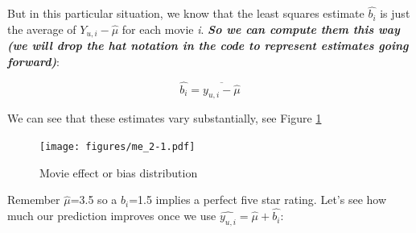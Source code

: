 \documentclass[
]{article}
\newenvironment{Shaded}{}{}
\newcommand{\AttributeTok}[1]{\textcolor[rgb]{0.49,0.56,0.16}{#1}}
\newcommand{\DecValTok}[1]{\textcolor[rgb]{0.25,0.63,0.44}{#1}}
\newcommand{\FloatTok}[1]{\textcolor[rgb]{0.25,0.63,0.44}{#1}}
\newcommand{\FunctionTok}[1]{\textcolor[rgb]{0.02,0.16,0.49}{#1}}
\newcommand{\NormalTok}[1]{#1}
\newcommand{\OtherTok}[1]{\textcolor[rgb]{0.00,0.44,0.13}{#1}}
\newcommand{\SpecialCharTok}[1]{\textcolor[rgb]{0.25,0.44,0.63}{#1}}
\newcommand{\StringTok}[1]{\textcolor[rgb]{0.25,0.44,0.63}{#1}}
\begin{document}
But in this particular situation, we know that the least squares
estimate \(\hat{b_{i}}\) is just the average of \(Y_{u,i}-\hat{\mu}\)
for each movie \emph{i}. \textbf{\emph{So we can compute them this way
(we will drop the hat notation in the code to represent estimates going
forward)}}:

%
\par

\label{eq:EqModel2-3} \begin{equation}
  \hat{b_{i}} = \overline{y_{u,i} - \hat{\mu}}
\end{equation}

\begin{Shaded}
\end{Shaded}

\newpage

We can see that these estimates vary substantially, see Figure
\ref{fig:model_2}

\begin{figure}
\centering
\texttt{[image: figures/me\_2-1.pdf]}
\caption{Movie effect or bias distribution\label{fig:model_2}}
\end{figure}

Remember \(\hat{\mu}\)=3.5 so a \(b_{i}\)=1.5 implies a perfect five
star rating. Let's see how much our prediction improves once we use
\(\hat{y_{u,i}}=\hat{\mu}+\hat{b_{i}}\):

\begin{Shaded}
\end{Shaded}

\newpage
\end{document}
